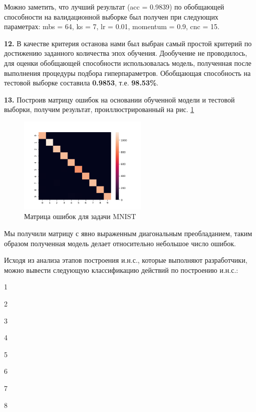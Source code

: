 				Можно заметить, что лучший результат (acc = 0.9839) по обобщающей способности на валидационной выборке был получен при следующих параметрах: mbs = 64, ks = 7, lr = 0.01, momentum = 0.9, cnc = 15.
				
				\textbf{12.} В качестве критерия останова нами был выбран самый простой критерий по достижению заданного количества эпох обучения. Дообучение не проводилось, для оценки обобщающей способности использовалась модель, полученная после выполнения процедуры подбора гиперпараметров. Обобщающая способность на тестовой выборке составила \textbf{0.9853}, т.е. \textbf{98.53\%}.
				
				\textbf{13.} Построив матрицу ошибок на основании обученной модели и тестовой выборки, получим результат, проиллюстрированный на рис. \ref{fig:conf_matrix_result}
				
				\begin{figure}[h]
					\centering
					\includegraphics[width=0.55\textwidth]{figures/conf_matrix_result.png}
					\caption{Матрица ошибок для задачи MNIST}
					\label{fig:conf_matrix_result}
				\end{figure}
				
				Мы получили матрицу с явно выраженным диагональным преобладанием, таким образом полученная модель делает относительно небольшое число ошибок.
				
				Исходя из анализа этапов построения и.н.с., которые выполняют разработчики, можно вывести следующую классификацию действий по построению и.н.с.:
				
				1
				
				2
				
				3
				
				4
				
				5
				
				6
				
				7
				
				8
				
